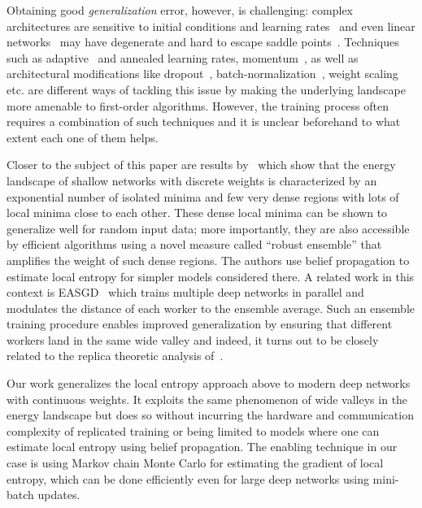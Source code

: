 \documentclass[10pt]{article}
\newcommand{\todo}[1]{{\color{gray}#1}\marginpar{\tiny\noindent{\raggedright{\color{blue}[TODO]}}}}
\begin{document}
Obtaining good \emph{generalization} error, however, is challenging: complex architectures are sensitive to initial conditions and learning rates~\citep{sutskever2013importance} and even linear networks~\citep{kawaguchi2016deep} may have degenerate and hard to escape saddle points~\citep{ge2015escaping,anandkumar2016efficient}. Techniques such as adaptive~\citep{duchi2011adaptive} and annealed learning rates, momentum~\citep{tieleman2012lecture}, as well as architectural modifications like dropout~\citep{srivastava2014dropout}, batch-normalization~\citep{ioffe2015batch,cooijmans2016recurrent}, weight scaling~\citep{salimans2016weight} etc. are different ways of tackling this issue by making the underlying landscape more amenable to first-order algorithms. However, the training process often requires a combination of such techniques and it is unclear beforehand to what extent each one of them helps.

\todo{Closer to the subject of this paper are results by~\citet{baldassi2015subdominant,baldassi2016unreasonable,baldassi2016multilevel} which show that the energy landscape of shallow networks with discrete weights is characterized by an exponential number of isolated minima and few very dense regions with lots of local minima close to each other. These dense local minima can be shown to generalize well for random input data; more importantly, they are also accessible by efficient algorithms using a novel measure called ``robust ensemble'' that amplifies the weight of such dense regions. The authors use belief propagation to estimate local entropy for simpler models considered there. A related work in this context is EASGD~\citep{zhang2015deep} which trains multiple deep networks in parallel and modulates the distance of each worker to the ensemble average. Such an ensemble training procedure enables improved generalization by ensuring that different workers land in the same wide valley and indeed, it turns out to be closely related to the replica theoretic analysis of~\citep{baldassi2016unreasonable}.

Our work generalizes the local entropy approach above to modern deep networks with continuous weights. It exploits the same phenomenon of wide valleys in the energy landscape but does so without incurring the hardware and communication complexity of replicated training or being limited to models where one can estimate local entropy using belief propagation. The enabling technique in our case is using Markov chain Monte Carlo for estimating the gradient of local entropy, which can be done efficiently even for large deep networks using mini-batch updates.}
\end{document}
